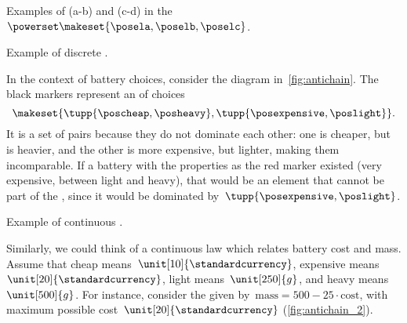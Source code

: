 \begin{marginfigure}



    \caption{Examples of  (a-b) and  (c-d) in the  $\powerset\makeset{\posela,\poselb,\poselc}$.}
\end{marginfigure}

\clearpage

\begin{marginfigure}
    \centering
    \caption{Example of discrete .
    }
    \label{fig:antichain}
\end{marginfigure}
\begin{example}
    In the context of battery choices, consider the diagram in~\cref{fig:antichain}.
    The black markers represent an  of choices
    \begin{equation}\label{eq:example-battery-antichain}
        \makeset{
            \tupp{\poscheap,\posheavy},
            \tupp{\posexpensive,\poslight}
        }.
    \end{equation}
    It is a set of pairs because they do not dominate each other: one is cheaper, but is heavier, and the other is more expensive, but lighter, making them incomparable.
    If a battery with the properties as the red marker existed (very expensive, between light and heavy), that would be an element that cannot be part of the , since it would be dominated by~$\tupp{\posexpensive,\poslight}$.
    \begin{marginfigure}
        \centering
        \caption{Example of continuous .}
        \label{fig:antichain_2}
    \end{marginfigure}
    Similarly, we could think of a continuous law which relates battery cost and mass.
    Assume that cheap means~$\unit[10]{\standardcurrency}$, expensive means~$\unit[20]{\standardcurrency}$, light means~$\unit[250]{g}$, and heavy means~$\unit[500]{g}$.
    For instance, consider the  given by~$\text{mass}=500-25\cdot \text{cost}$, with maximum possible cost~$\unit[20]{\standardcurrency}$ (\cref{fig:antichain_2}).
\end{example}

